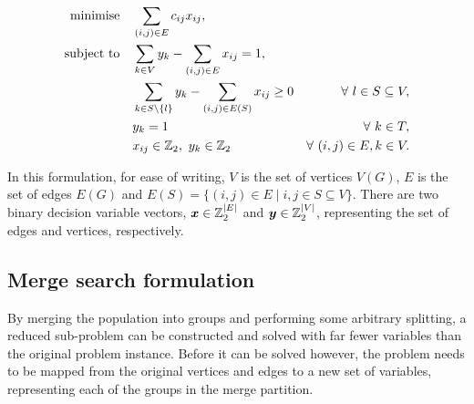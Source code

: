 \documentclass[journal]{IEEEtran}
\begin{document}
\begin{align}
\Min \quad & \displaystyle\sum_{(i,j) \in E} c_{ij}x_{ij},\label{eq:stpg_form}\\
\ST \quad & \displaystyle\sum_{k \in V}y_{k} - \displaystyle\sum_{(i,j) \in E}x_{ij} = 1,\nonumber\\
& \displaystyle\sum_{k \in S\setminus \{l\}}y_{k} - \displaystyle\sum_{(i,j) \in E(S)}x_{ij} \geq 0 & \forall\ l \in S \subseteq V,\nonumber\\
& y_k = 1 & \forall\ k \in T,\nonumber\\
& x_{ij} \in \Bin,\ y_k \in \Bin & \forall\ (i,j) \in E, k \in V\nonumber.
\end{align}

In this formulation, for ease of writing, \(V\) is the set of vertices \(V(G)\), \(E\) is the set of edges \(E(G)\) and \(E(S) = \{(i,j) \in E \mid i,j \in S \subseteq V\}\). There are two binary decision variable vectors, \(\boldsymbol{x} \in \mathbb{Z}_2^{|E|}\) and \(\boldsymbol{y} \in \mathbb{Z}_2^{|V|}\), representing the set of edges and vertices, respectively.

\subsection*{Merge search formulation}
By merging the population into groups and performing some arbitrary splitting, a reduced sub-problem can be constructed and solved with far fewer variables than the original problem instance. Before it can be solved however, the problem needs to be mapped from the original vertices and edges to a new set of variables, representing each of the groups in the merge partition.
\end{document}

